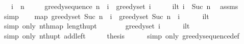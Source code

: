 \begin{isabellebody}
\ \ \ {\isachardoublequoteopen}i\ {\isasymle}\ n{\isachardoublequoteclose}\isanewline
\ \ \ \ \ {\isachardoublequoteopen}greedy{\isacharunderscore}{\kern0pt}sequence\ n\ {\isacharbang}{\kern0pt}\ i\ {\isacharequal}{\kern0pt}\ greedy{\isacharunderscore}{\kern0pt}set\ i{\isachardoublequoteclose}\isanewline
%
\isadelimproof
%
\endisadelimproof
%
\isatagproof
{}\isamarkupfalse%
\ {\isacharminus}{\kern0pt}\isanewline
\ \ \isamarkupfalse%
\ i{\isacharunderscore}{\kern0pt}lt{\isacharcolon}{\kern0pt}\ {\isachardoublequoteopen}i\ {\isacharless}{\kern0pt}\ Suc\ n{\isachardoublequoteclose}\ \isamarkupfalse%
\ assms\ \isamarkupfalse%
\ simp\isanewline
\ \ \isamarkupfalse%
\ {\isachardoublequoteopen}{\isacharparenleft}{\kern0pt}map\ greedy{\isacharunderscore}{\kern0pt}set\ {\isacharbrackleft}{\kern0pt}{}{\isachardot}{\kern0pt}{\isachardot}{\kern0pt}{\isacharless}{\kern0pt}Suc\ n{\isacharbrackright}{\kern0pt}{\isacharparenright}{\kern0pt}\ {\isacharbang}{\kern0pt}\ i\ {\isacharequal}{\kern0pt}\ greedy{\isacharunderscore}{\kern0pt}set\ {\isacharparenleft}{\kern0pt}{\isacharbrackleft}{\kern0pt}{}{\isachardot}{\kern0pt}{\isachardot}{\kern0pt}{\isacharless}{\kern0pt}Suc\ n{\isacharbrackright}{\kern0pt}\ {\isacharbang}{\kern0pt}\ i{\isacharparenright}{\kern0pt}{\isachardoublequoteclose}\isanewline
\ \ \ \ \isamarkupfalse%
\ i{\isacharunderscore}{\kern0pt}lt\ \isamarkupfalse%
\ {\isacharparenleft}{\kern0pt}simp\ only{\isacharcolon}{\kern0pt}\ nth{\isacharunderscore}{\kern0pt}map\ length{\isacharunderscore}{\kern0pt}upt{\isacharparenright}{\kern0pt}\isanewline
\ \ \isamarkupfalse%
\ \isamarkupfalse%
\ {\isachardoublequoteopen}{\isachardot}{\kern0pt}{\isachardot}{\kern0pt}{\isachardot}{\kern0pt}\ {\isacharequal}{\kern0pt}\ greedy{\isacharunderscore}{\kern0pt}set\ i{\isachardoublequoteclose}\isanewline
\ \ \ \ \isamarkupfalse%
\ i{\isacharunderscore}{\kern0pt}lt\ \isamarkupfalse%
\ {\isacharparenleft}{\kern0pt}simp\ only{\isacharcolon}{\kern0pt}\ nth{\isacharunderscore}{\kern0pt}upt\ add{\isacharunderscore}{\kern0pt}{}{\isacharunderscore}{\kern0pt}left{\isacharparenright}{\kern0pt}\isanewline
\ \ \isamarkupfalse%
\ \isamarkupfalse%
\ {\isacharquery}{\kern0pt}thesis\isanewline
\ \ \ \ \isamarkupfalse%
\ {\isacharparenleft}{\kern0pt}simp\ only{\isacharcolon}{\kern0pt}\ greedy{\isacharunderscore}{\kern0pt}sequence{\isacharunderscore}{\kern0pt}def{\isacharparenright}{\kern0pt}\isanewline

\end{isabellebody}
